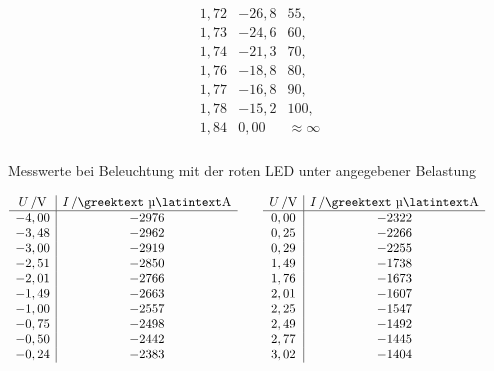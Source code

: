\documentclass[numbers=noenddot,12pt,a4paper]{scrartcl}
\newcommand{\greek}[1]{\greektext#1\latintext}
\begin{document}
\begin{table}[H]
\begin{align*}
\begin{array}{c|c|c}
	1,72 & -26,8 & 55, \\
	1,73 & -24,6 & 60, \\
	1,74 & -21,3 & 70, \\
	1,76 & -18,8 & 80, \\
	1,77 & -16,8 & 90, \\
	1,78 & -15,2 & 100, \\
	1,84 & 0,00 & \approx\infty \\		
	\, & \, & \,
	\end{array}  
	\end{align*}
	\vspace{-1em}
	\caption{Messwerte bei Beleuchtung mit der roten LED unter angegebener Belastung}
	\label{tab:rotb}
\end{table}
\begin{table}[H]
	\begin{align*}
	\begin{array}{c|c}
	\unit[U]{/V} & \unit[I]{/\text{\greek{µ}}A}\\\hline
	-4,00 & -2976 \\
	-3,48 & -2962 \\
	-3,00 & -2919 \\
	-2,51 & -2850 \\
	-2,01 & -2766 \\
	-1,49 & -2663 \\
	-1,00 & -2557 \\
	-0,75 & -2498 \\
	-0,50 & -2442 \\
	-0,24 & -2383 \\
	\end{array}
	\hspace{2em}
	\begin{array}{c|c}
	\unit[U]{/V} & \unit[I]{/\text{\greek{µ}}A}\\\hline
	0,00 & -2322 \\
	0,25 & -2266 \\
	0,29 & -2255 \\
	1,49 & -1738 \\
	1,76 & -1673 \\
	2,01 & -1607 \\
	2,25 & -1547 \\
	2,49 & -1492 \\
	2,77 & -1445 \\
	3,02 & -1404 \\
	\end{array}
	\hspace{2em}
	\begin{array}{c|c}

\end{array}
\end{align*}
\end{table}
\end{document}
